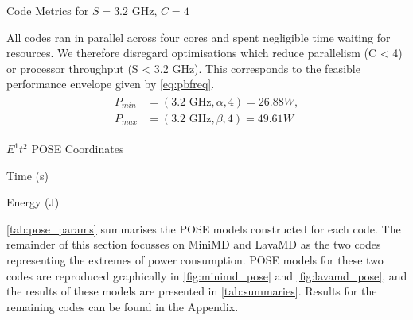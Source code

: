 \begin{table}
  \scriptsize
  \centering
  \caption{Code Metrics for $S = 3.2\text{ GHz}$, $C = 4$}
  \label{tab:code_metrics}
  
\end{table}

All codes ran in parallel across four cores and spent negligible time waiting for resources.
We therefore disregard optimisations which reduce parallelism (C < 4) or processor throughput (S < 3.2 GHz).
This corresponds to the feasible performance envelope given by \autoref{eq:pbfreq}.
\begin{align}
  \label{eq:pbfreq}
  \begin{split}
    P_{min} &= (3.2\text{ GHz}, \alpha, 4) = 26.88W, \\
    P_{max} &= (3.2\text{ GHz}, \beta, 4) = 49.61W
  \end{split}
\end{align}

\begin{table}
  \setlength{\tabcolsep}{.5em}
  \scriptsize
  \caption{$E^1t^2$ POSE Coordinates}
  \begin{subtable}{\linewidth}
  \centering
  \caption{Time (s)}
  
  \end{subtable}
  \par\bigskip 
  \begin{subtable}{\linewidth}
  \centering
  \caption{Energy (J)}
  
  \end{subtable}
  \label{tab:pose_params}
\end{table}

\noindent
\autoref{tab:pose_params} summarises the POSE models constructed for each code.
The remainder of this section focusses on MiniMD and LavaMD as the two codes representing the extremes of power consumption.
POSE models for these two codes are reproduced graphically in \autoref{fig:minimd_pose} and \autoref{fig:lavamd_pose}, and the results of these models are presented in \autoref{tab:summaries}.
Results for the remaining codes can be found in the Appendix.

